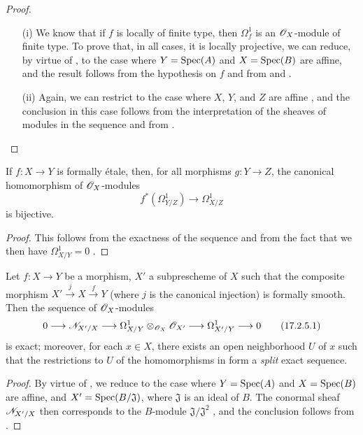 \begin{proof}
\begin{enumerate}
  \item[(i)] We know  that if $f$ is locally of finite type, then $\Omega_f^1$ is an $\mathscr{O}_X$-module of finite type. 
    To prove that, in all cases, it is locally projective, we can reduce, by virtue of , to the case where $Y=\operatorname{Spec}(A)$ and $X=\operatorname{Spec}(B)$ are affine, and the result follows from the hypothesis on $f$ and from  and .
  \item[(ii)] Again, we can restrict to the case where $X$, $Y$, and $Z$ are affine , and the conclusion in this case follows from the interpretation of the sheaves of modules in the sequence  and from .
\end{enumerate}
\end{proof}

\begin{corollary}[17.2.4]
\label{IV.17.2.4}
If $f:X\to Y$ is formally \'etale, then, for all morphisms $g:Y\to Z$, the canonical homomorphism of $\mathscr{O}_X$-modules
\[
  f^*(\Omega_{Y/Z}^1)\to\Omega_{X/Z}^1
\]
is bijective.
\end{corollary}

\begin{proof}
This follows from the exactness of the sequence  and from the fact that we then have $\Omega_{X/Y}^1=0$ .
\end{proof}

\begin{proposition}[17.2.5]
\label{IV.17.2.5}
Let $f:X\to Y$ be a morphism, $X'$ a subprescheme of $X$ such that the composite morphism $X'\xrightarrow{j}X\xrightarrow{f}Y$ (where $j$ is the canonical injection) is formally smooth.
Then the sequence of $\mathscr{O}_X$-modules 
\[
\label{IV.17.2.5.1}
  0\to\sh{N}_{X'/X}\to\Omega_{X/Y}^1\otimes_{\sh{O}_X}\sh{O}_{X'}\to\Omega_{X'/Y}^1\to 0
\tag{17.2.5.1}
\]
is exact; moreover, for each $x\in X$, there exists an open neighborhood $U$ of $x$ such that the restrictions to $U$ of the homomorphisms in  form a \emph{split} exact sequence.
\end{proposition}

\begin{proof}
By virtue of , we reduce to the case where $Y=\operatorname{Spec}(A)$ and $X=\operatorname{Spec}(B)$ are affine, and $X'=\operatorname{Spec}(B/\mathfrak{J})$, where $\mathfrak{J}$ is an ideal of $B$. 
The conormal sheaf $\mathscr{N}_{X'/X}$ then corresponds to the $B$-module $\mathfrak{J}/\mathfrak{J}^2$ , and the conclusion follows from .
\end{proof}

